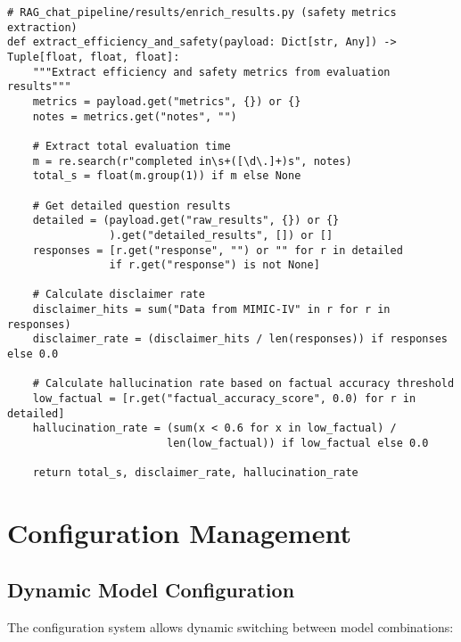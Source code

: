 \begin{verbatim}
# RAG_chat_pipeline/results/enrich_results.py (safety metrics extraction)
def extract_efficiency_and_safety(payload: Dict[str, Any]) -> Tuple[float, float, float]:
    """Extract efficiency and safety metrics from evaluation results"""
    metrics = payload.get("metrics", {}) or {}
    notes = metrics.get("notes", "")
    
    # Extract total evaluation time
    m = re.search(r"completed in\s+([\d\.]+)s", notes)
    total_s = float(m.group(1)) if m else None

    # Get detailed question results
    detailed = (payload.get("raw_results", {}) or {}
                ).get("detailed_results", []) or []
    responses = [r.get("response", "") or "" for r in detailed 
                if r.get("response") is not None]

    # Calculate disclaimer rate
    disclaimer_hits = sum("Data from MIMIC-IV" in r for r in responses)
    disclaimer_rate = (disclaimer_hits / len(responses)) if responses else 0.0

    # Calculate hallucination rate based on factual accuracy threshold
    low_factual = [r.get("factual_accuracy_score", 0.0) for r in detailed]
    hallucination_rate = (sum(x < 0.6 for x in low_factual) / 
                         len(low_factual)) if low_factual else 0.0

    return total_s, disclaimer_rate, hallucination_rate
\end{verbatim}

\section{Configuration Management}

\subsection{Dynamic Model Configuration}

The configuration system allows dynamic switching between model combinations:

